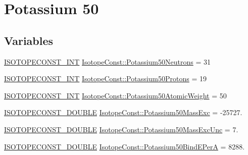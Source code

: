 \hypertarget{group___isotope_const-_potassium-_k50}{}\section{Potassium 50}
\label{group___isotope_const-_potassium-_k50}
\subsection*{Variables}
\begin{DoxyCompactItemize}
\item 
\mbox{\hyperlink{group___isotope_const-_macros_ga5f18360b3e99483a35c32d789e62621c}{I\+S\+O\+T\+O\+P\+E\+C\+O\+N\+S\+T\+\_\+\+I\+NT}} \mbox{\hyperlink{group___isotope_const-_potassium-_k50_ga9d3f7b3ce6a3a080d549aa4d14bf090b}{Isotope\+Const\+::\+Potassium50\+Neutrons}} = 31
\item 
\mbox{\hyperlink{group___isotope_const-_macros_ga5f18360b3e99483a35c32d789e62621c}{I\+S\+O\+T\+O\+P\+E\+C\+O\+N\+S\+T\+\_\+\+I\+NT}} \mbox{\hyperlink{group___isotope_const-_potassium-_k50_ga1c509db486fdc98fbe9b1b110501a197}{Isotope\+Const\+::\+Potassium50\+Protons}} = 19
\item 
\mbox{\hyperlink{group___isotope_const-_macros_ga5f18360b3e99483a35c32d789e62621c}{I\+S\+O\+T\+O\+P\+E\+C\+O\+N\+S\+T\+\_\+\+I\+NT}} \mbox{\hyperlink{group___isotope_const-_potassium-_k50_gaa6e7a8c898d26c93c1e9c435960cf48e}{Isotope\+Const\+::\+Potassium50\+Atomic\+Weight}} = 50
\item 
\mbox{\hyperlink{group___isotope_const-_macros_ga8f45a7272ce02c0b4c65c44636ed719a}{I\+S\+O\+T\+O\+P\+E\+C\+O\+N\+S\+T\+\_\+\+D\+O\+U\+B\+LE}} \mbox{\hyperlink{group___isotope_const-_potassium-_k50_ga372a3ee2d06da4d4e39d75db1782404d}{Isotope\+Const\+::\+Potassium50\+Mass\+Exc}} = -\/25727.
\item 
\mbox{\hyperlink{group___isotope_const-_macros_ga8f45a7272ce02c0b4c65c44636ed719a}{I\+S\+O\+T\+O\+P\+E\+C\+O\+N\+S\+T\+\_\+\+D\+O\+U\+B\+LE}} \mbox{\hyperlink{group___isotope_const-_potassium-_k50_gae91d4b3a40a120b0e11cc9e3b1e938c0}{Isotope\+Const\+::\+Potassium50\+Mass\+Exc\+Unc}} = 7.
\item 
\mbox{\hyperlink{group___isotope_const-_macros_ga8f45a7272ce02c0b4c65c44636ed719a}{I\+S\+O\+T\+O\+P\+E\+C\+O\+N\+S\+T\+\_\+\+D\+O\+U\+B\+LE}} \mbox{\hyperlink{group___isotope_const-_potassium-_k50_ga8ca0f859616debbbff4a9ab97db72940}{Isotope\+Const\+::\+Potassium50\+Bind\+E\+PerA}} = 8288.
\item 

\end{DoxyCompactItemize}
